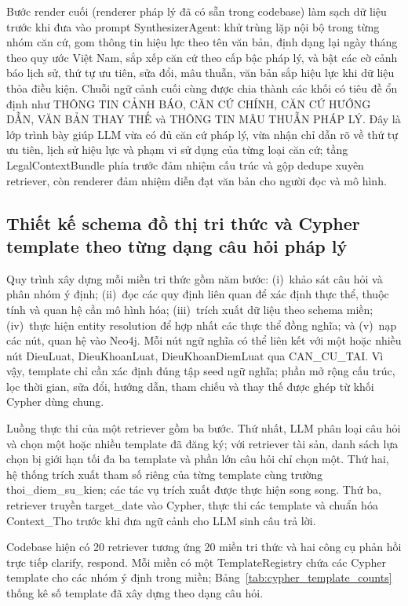 \documentclass[../DoAn.tex]{subfiles}
\begin{document}
Bước render cuối (renderer pháp lý đã có sẵn trong codebase) làm sạch dữ liệu trước khi đưa vào prompt SynthesizerAgent: khử trùng lặp nội bộ trong từng nhóm căn cứ, gom thông tin hiệu lực theo tên văn bản, định dạng lại ngày tháng theo quy ước Việt Nam, sắp xếp căn cứ theo cấp bậc pháp lý, và bật các cờ cảnh báo lịch sử, thứ tự ưu tiên, sửa đổi, mâu thuẫn, văn bản sắp hiệu lực khi dữ liệu thỏa điều kiện. Chuỗi ngữ cảnh cuối cùng được chia thành các khối có tiêu đề ổn định như THÔNG TIN CẢNH BÁO, CĂN CỨ CHÍNH, CĂN CỨ HƯỚNG DẪN, VĂN BẢN THAY THẾ và THÔNG TIN MÂU THUẪN PHÁP LÝ. Đây là lớp trình bày giúp LLM vừa có đủ căn cứ pháp lý, vừa nhận chỉ dẫn rõ về thứ tự ưu tiên, lịch sử hiệu lực và phạm vi sử dụng của từng loại căn cứ; tầng LegalContextBundle phía trước đảm nhiệm cấu trúc và gộp dedupe xuyên retriever, còn renderer đảm nhiệm diễn đạt văn bản cho người đọc và mô hình.

\subsection{Thiết kế schema đồ thị tri thức và Cypher template theo từng dạng câu hỏi pháp lý}

Quy trình xây dựng mỗi miền tri thức gồm năm bước: (i)~khảo sát câu hỏi và phân nhóm ý định; (ii)~đọc các quy định liên quan để xác định thực thể, thuộc tính và quan hệ cần mô hình hóa; (iii)~trích xuất dữ liệu theo schema miền; (iv)~thực hiện entity resolution để hợp nhất các thực thể đồng nghĩa; và (v)~nạp các nút, quan hệ vào Neo4j. Mỗi nút ngữ nghĩa có thể liên kết với một hoặc nhiều nút DieuLuat, DieuKhoanLuat, DieuKhoanDiemLuat qua CAN\_CU\_TAI. Vì vậy, template chỉ cần xác định đúng tập seed ngữ nghĩa; phần mở rộng cấu trúc, lọc thời gian, sửa đổi, hướng dẫn, tham chiếu và thay thế được ghép từ khối Cypher dùng chung.

Luồng thực thi của một retriever gồm ba bước. Thứ nhất, LLM phân loại câu hỏi và chọn một hoặc nhiều template đã đăng ký; với retriever tài sản, danh sách lựa chọn bị giới hạn tối đa ba template và phần lớn câu hỏi chỉ chọn một. Thứ hai, hệ thống trích xuất tham số riêng của từng template cùng trường thoi\_diem\_su\_kien; các tác vụ trích xuất được thực hiện song song. Thứ ba, retriever truyền target\_date vào Cypher, thực thi các template và chuẩn hóa Context\_Tho trước khi đưa ngữ cảnh cho LLM sinh câu trả lời.

Codebase hiện có 20 retriever tương ứng 20 miền tri thức và hai công cụ phản hồi trực tiếp clarify, respond. Mỗi miền có một TemplateRegistry chứa các Cypher template cho các nhóm ý định trong miền; Bảng~\ref{tab:cypher_template_counts} thống kê số template đã xây dựng theo dạng câu hỏi.
\end{document}

